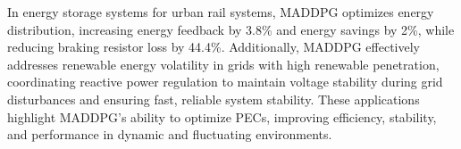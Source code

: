 In energy storage systems for urban rail systems, MADDPG optimizes energy distribution, increasing energy feedback by 3.8\% and energy savings by 2\%, while reducing braking resistor loss by 44.4\%. Additionally, MADDPG effectively addresses renewable energy volatility in grids with high renewable penetration, coordinating reactive power regulation to maintain voltage stability during grid disturbances and ensuring fast, reliable system stability. These applications highlight MADDPG's ability to optimize PECs, improving efficiency, stability, and performance in dynamic and fluctuating environments.




